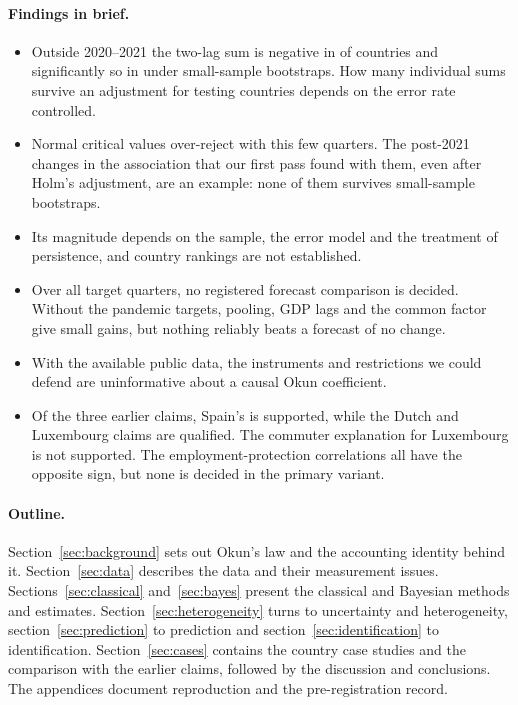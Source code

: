 \paragraph{Findings in brief.}
\begin{itemize}
  \item Outside 2020--2021 the two-lag sum is negative in  of
     countries and significantly so in  under
    small-sample bootstraps. How many individual sums survive an adjustment for testing
     countries depends on the error rate controlled.
  \item Normal critical values over-reject with this few quarters. The
     post-2021 changes in the association that our first pass found
    with them, even after Holm's adjustment, are an example: none of them survives
    small-sample bootstraps.
  \item Its magnitude depends on the sample, the error model and the treatment of
    persistence, and country rankings are not established.
  \item Over all target quarters, no registered forecast comparison is decided. Without
    the pandemic targets, pooling, GDP lags and the common factor give small gains, but
    nothing reliably beats a forecast of no change.
  \item With the available public data, the instruments and restrictions we could defend
    are uninformative about a causal Okun coefficient.
  \item Of the three earlier claims, Spain's is supported, while the Dutch and Luxembourg
    claims are qualified. The commuter explanation for Luxembourg is not supported. The
    employment-protection correlations all have the opposite sign, but none is decided
    in the primary variant.
\end{itemize}

\paragraph{Outline.} Section~\ref{sec:background} sets out Okun's law and the accounting
identity behind it. Section~\ref{sec:data} describes the data and their measurement
issues. Sections~\ref{sec:classical} and~\ref{sec:bayes} present the classical and
Bayesian methods and estimates. Section~\ref{sec:heterogeneity} turns to uncertainty and
heterogeneity, section~\ref{sec:prediction} to prediction and
section~\ref{sec:identification} to identification. Section~\ref{sec:cases} contains the
country case studies and the comparison with the earlier claims, followed by the
discussion and conclusions. The appendices document reproduction and the pre-registration
record.
